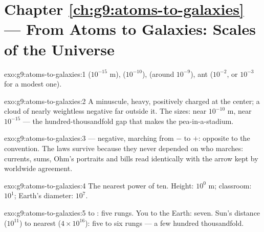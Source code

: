 \section*{Chapter \ref{ch:g9:atoms-to-galaxies} --- From Atoms to Galaxies: Scales of the Universe}

\begin{solution}{exo:g9:atoms-to-galaxies:1}
 ($10^{-15}$ \unit{m}),  ($10^{-10}$), 
(around $10^{-9}$), ant ($10^{-2}$, or $10^{-3}$ for a
modest one).
\end{solution}

\begin{solution}{exo:g9:atoms-to-galaxies:2}
A minuscule, heavy, positively charged  at the
center; a cloud of nearly weightless negative  far
outside it. The sizes:  near $10^{-10}$ \unit{m},
 near $10^{-15}$ --- the hundred-thousandfold gap
that makes the pea-in-a-stadium.
\end{solution}

\begin{solution}{exo:g9:atoms-to-galaxies:3}
 --- negative, marching from $-$ to $+$: opposite
to the convention. The laws survive because they never
depended on who marches: currents,  sums, Ohm's
portraits and  bills read identically with the arrow
kept by worldwide agreement.
\end{solution}

\begin{solution}{exo:g9:atoms-to-galaxies:4}
The nearest power of ten. Height: $10^{0}$ \unit{m};
classroom: $10^{1}$; Earth's diameter: $10^{7}$.
\end{solution}

\begin{solution}{exo:g9:atoms-to-galaxies:5}
 to : five rungs. You to the Earth: seven. Sun's
distance ($10^{11}$) to nearest  ($4 \times 10^{16}$):
five to six rungs --- a few hundred thousandfold.
\end{solution}

